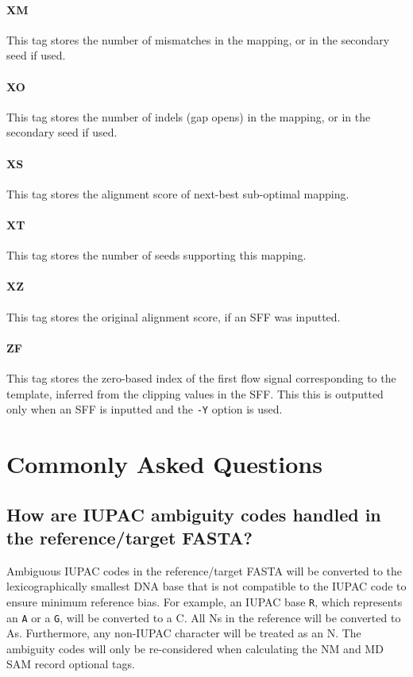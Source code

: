 \documentclass[a4paper,12pt]{book}
\newcommand{\TT}[1]{{\tt #1}} %
\begin{document}
\subsubsection{XM}
This tag stores the number of mismatches in the mapping, or in the secondary seed if used.

\subsubsection{XO}
This tag stores the number of indels (gap opens) in the mapping, or in the secondary seed if used.

\subsubsection{XS}
This tag stores the alignment score of next-best sub-optimal mapping.

\subsubsection{XT}
This tag stores the number of seeds supporting this mapping.
\subsubsection{XZ}
This tag stores the original alignment score, if an SFF was inputted.


\subsubsection{ZF}
This tag stores the zero-based index of the first flow signal corresponding to the template, inferred from the clipping values in the SFF.
This this is outputted only when an SFF is inputted and the \TT{-Y} option is used.

\chapter{Commonly Asked Questions}
\label{chap:faq}

\mtcaddchapter 
\minitoc

\section{How are IUPAC ambiguity codes handled in the reference/target FASTA?}
\label{sec:iupac}
Ambiguous IUPAC codes in the reference/target FASTA will be converted to the lexicographically smallest DNA base that is not compatible to the IUPAC code to ensure minimum reference bias.
For example, an IUPAC base \TT{R}, which represents an \TT{A} or a \TT{G}, will be converted to a C.
All Ns in the reference will be converted to As.
Furthermore, any non-IUPAC character will be treated as an N.
The ambiguity codes will only be re-considered when calculating the NM and MD SAM record optional tags.
\end{document}
